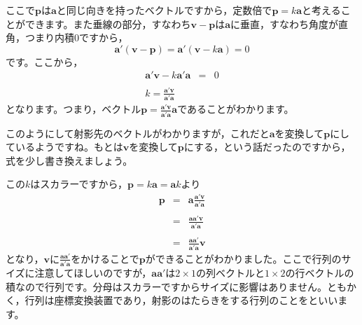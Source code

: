 \documentclass{ltjsbook}
\begin{document}
ここで$\bm{p}$は$\bm{a}$と同じ向きを持ったベクトルですから，定数倍で$\bm{p}=k\bm{a}$と考えることができます。また垂線の部分，すなわち$\bm{v}-\bm{p}$は$\bm{a}$に垂直，すなわち角度が直角，つまり内積$0$ですから，
\[ \bm{a}'(\bm{v}-\bm{p}) = \bm{a}'(\bm{v}-k\bm{a}) = 0 \]
です。ここから，
\[
	\begin{array}{rrr}
		\bm{a}'\bm{v} - k\bm{a}'\bm{a} & = & 0 \\
		                               &   &   \\
		k = \displaystyle \frac{\bm{a}'\bm{v}}{\bm{a}'\bm{a}}
	\end{array}
\]
となります。つまり，ベクトル$\bm{p} = \frac{\bm{a}'\bm{v}}{\bm{a}'\bm{a}}\bm{a}$であることがわかります。

このようにして射影先のベクトルがわかりますが，これだと$\bm{a}$を変換して$\bm{p}$にしているようですね。もとは$\bm{v}$を変換して$\bm{p}$にする，という話だったのですから，式を少し書き換えましょう。

この$k$はスカラーですから，$\bm{p} = k\bm{a} = \bm{a}k$より
\[
	\begin{array}{rrr}
		\bm{p} & = & \bm{a}\displaystyle\frac{\bm{a}'\bm{v}}{\bm{a}'\bm{a}} \\
		       &   &                                                        \\
		       & = & \displaystyle\frac{\bm{a}\bm{a}'\bm{v}}{\bm{a}'\bm{a}} \\
		       &   &                                                        \\
		       & = & \displaystyle\frac{\bm{a}\bm{a}'}{\bm{a}'\bm{a}}\bm{v}
	\end{array}
\]
となり，$\bm{v}$に$\frac{\bm{a}\bm{a}'}{\bm{a}'\bm{a}}$をかけることで$\bm{p}$ができることがわかりました。ここで行列のサイズに注意してほしいのですが，$\bm{a}\bm{a}'$は$2\times1$の列ベクトルと$1\times2$の行ベクトルの積なので行列です。分母はスカラーですからサイズに影響はありません。ともかく，行列は座標変換装置であり，射影のはたらきをする行列のことをといいます。
\end{document}

